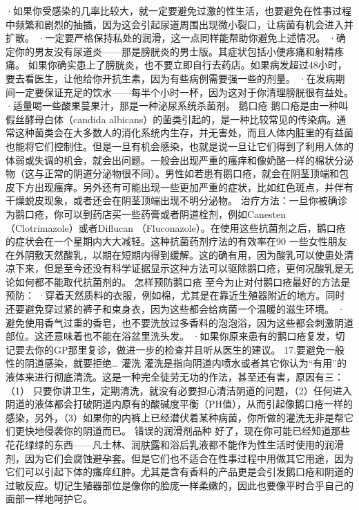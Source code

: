 \documentclass[12pt,UTF8]{ctexbook}
\begin{document}
·如果你受感染的几率比较大，就一定要避免过激的性生活，也要避免在性事过程中频繁和剧烈的抽插，因为这会引起尿道周围出现微小裂口，让病菌有机会进入并扩散。
·一定要严格保持私处的润滑，这一点同样能帮助你避免上述情况。
·确定你的男友没有尿道炎——那是膀胱炎的男士版。其症状包括小便疼痛和射精疼痛。
如果你确实患上了膀胱炎，也不要立即自行去药店。如果病发超过48小时，要去看医生，让他给你开抗生素，因为有些病例需要强一些的剂量。
·在发病期间一定要保证充足的饮水——每半个小时一杯，因为这对于你清理膀胱很有益处。
·适量喝一些酸果蔓果汁，那是一种泌尿系统杀菌剂。
鹅口疮
鹅口疮是由一种叫假丝酵母白体（candida albicans）的菌类引起的，是一种比较常见的传染病。通常这种菌类会在大多数人的消化系统内生存，并无害处，而且人体内脏里的有益菌也能将它们控制住。但是一旦有机会感染，也就是说一旦让它们得到了利用人体的体弱或失调的机会，就会出问题。一般会出现严重的瘙痒和像奶酪一样的棉状分泌物（这与正常的阴道分泌物很不同）。男性如若患有鹅口疮，就会在阴茎顶端和包皮下方出现瘙痒。另外还有可能出现一些更加严重的症状，比如红色斑点，并伴有干燥蜕皮现象，或者还会在阴茎顶端出现不明分泌物。
治疗方法：一旦你被确诊为鹅口疮，你可以到药店买一些药膏或者阴道栓剂，例如Canesten（Clotrimazole）或者Diflucan （Fluconazole）。在使用这些抗菌剂之后，鹅口疮的症状会在一个星期内大大减轻。这种抗菌药剂疗法的有效率在90%
一些女性朋友在外阴敷天然酸乳，以期在短期内得到缓解。这的确有用，因为酸乳可以使患处清凉下来，但是至今还没有科学证据显示这种方法可以驱除鹅口疮，更何况酸乳是无论如何都不能取代抗菌剂的。
怎样预防鹅口疮
至今为止对付鹅口疮最好的方法是预防：
·穿着天然质料的衣服，例如棉，尤其是在靠近生殖器附近的地方。同时还要避免穿过紧的裤子和束身衣，因为这些都会给病菌一个温暖的滋生环境。
·避免使用香气过重的香皂，也不要洗放过多香料的泡泡浴，因为这些都会刺激阴道部位。这还意味着也不能在浴盆里洗头发。
·如果你原来患有的鹅口疮复发，切记要去你的GP那里复诊，做进一步的检查并且听从医生的建议。
17.要避免一般性的阴道感染，就要拒绝…
灌洗
灌洗是指向阴道内喷水或者其它你认为“有用”的液体来进行彻底清洗。这是一种完全徒劳无功的作法，甚至还有害，原因有三：
（1） 只要你讲卫生，定期清洗，就没有必要担心清洁阴道的问题，（2）任何进入阴道的液体都会打破阴道内原有的酸碱度平衡（PH值），从而引起像鹅口疮一样的感染，另外，（3）如果你的内裤上已经潜伏着某种病菌，你所做的灌洗无非是帮它们更快地侵袭你的阴道而已。
错误的润滑剂品种
好了，现在你可能已经知道那些花花绿绿的东西——凡士林、润肤露和浴后乳液都不能作为性生活时使用的润滑剂，因为它们会腐蚀避孕套。但是它们也不适合在性事过程中用做其它用途，因为它们可以引起下体的瘙痒红肿。尤其是含有香料的产品更是会引发鹅口疮和阴道的过敏反应。切记生殖器部位是像你的脸庞一样柔嫩的，因此也要像平时合乎自己的面部一样地呵护它。
\end{document}
